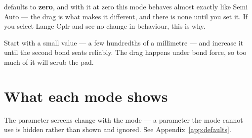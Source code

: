 \begin{wbwarning}
 defaults to \textbf{zero}, and with it at zero this mode
behaves almost exactly like Semi Auto --- the drag is what makes it different,
and there is none until you set it. If you select Lange Cplr and see no change
in behaviour, this is why.
\end{wbwarning}

Start with a small value --- a few hundredths of a millimetre --- and increase
it until the second bond seats reliably. The drag happens under bond force, so
too much of it will scrub the pad.


\section{What each mode shows}

The parameter screens change with the mode --- a parameter the mode cannot use
is hidden rather than shown and ignored. See Appendix~\ref{app:defaults}.
